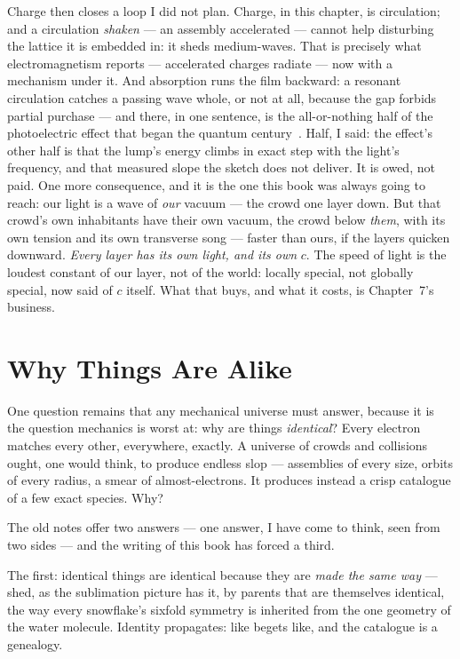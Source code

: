 \documentclass[fontsize=11pt,paper=a4,pagesize=auto,parskip=half-]{scrbook}
\begin{document}
Charge then closes a loop I did not plan. Charge, in this chapter, is circulation; and a circulation \emph{shaken} --- an assembly accelerated --- cannot help disturbing the lattice it is embedded in: it sheds medium-waves. That is precisely what electromagnetism reports --- accelerated charges radiate --- now with a mechanism under it. And absorption runs the film backward: a resonant circulation catches a passing wave whole, or not at all, because the gap forbids partial purchase --- and there, in one sentence, is the all-or-nothing half of the photoelectric effect that began the quantum century~\cite{einstein1905photo}. Half, I said: the effect's other half is that the lump's energy climbs in exact step with the light's frequency, and that measured slope the sketch does not deliver. It is owed, not paid. One more consequence, and it is the one this book was always going to reach: our light is a wave of \emph{our} vacuum --- the crowd one layer down. But that crowd's own inhabitants have their own vacuum, the crowd below \emph{them}, with its own tension and its own transverse song --- faster than ours, if the layers quicken downward. \emph{Every layer has its own light, and its own} $c$. The speed of light is the loudest constant of our layer, not of the world: locally special, not globally special, now said of $c$ itself. What that buys, and what it costs, is Chapter~7's business.

\section{Why Things Are Alike}

One question remains that any mechanical universe must answer, because it is the question mechanics is worst at: why are things \emph{identical}? Every electron matches every other, everywhere, exactly. A universe of crowds and collisions ought, one would think, to produce endless slop --- assemblies of every size, orbits of every radius, a smear of almost-electrons. It produces instead a crisp catalogue of a few exact species. Why?

The old notes offer two answers --- one answer, I have come to think, seen from two sides --- and the writing of this book has forced a third.

The first: identical things are identical because they are \emph{made the same way} --- shed, as the sublimation picture has it, by parents that are themselves identical, the way every snowflake's sixfold symmetry is inherited from the one geometry of the water molecule. Identity propagates: like begets like, and the catalogue is a genealogy.
\end{document}
